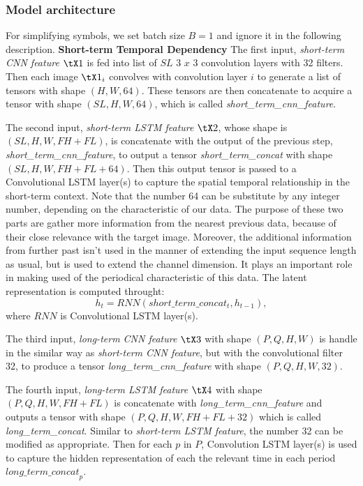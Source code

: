 \subsubsection{Model architecture}
For simplifying symbols, we set batch size $B = 1$ and ignore it in the following description.
\textbf{Short-term Temporal Dependency}
The first input, \textit{short-term CNN feature} $\tX1$ is fed into list of $SL$ 3 $x$ 3 convolution layers with 32 filters. Then each image $\tX1_i$ convolves with convolution layer $i$ to generate a list of tensors with shape $(H, W, 64)$. These tensors are then concatenate to acquire a tensor with shape $(SL, H, W, 64)$, which is called \textit{short\_term\_cnn\_feature}.

The second input, \textit{short-term LSTM feature} $\tX2$, whose shape is $(SL, H, W, FH + FL)$, is concatenate with the output of the previous step, \textit{short\_term\_cnn\_feature}, to output a tensor \textit{short\_term\_concat} with shape $(SL, H, W, FH + FL + 64)$. Then this output tensor is passed to a Convolutional LSTM layer(s) to capture the spatial temporal relationship in the short-term context. Note that the number 64 can be substitute by any integer number, depending on the characteristic of our data. The purpose of these two parts are gather more information from the nearest previous data, because of their close relevance with the target image. Moreover, the additional information from further past isn't used in the manner of extending the input sequence length as usual, but is used to extend the channel dimension. It plays an important role in making used of the periodical characteristic of this data. The latent representation is computed throught:
\[ h_t = RNN(short\_term\_concat_t, h_{t-1}), \] \label{equation-short-term-information}
where $RNN$ is Convolutional LSTM layer(s).

The third input, \textit{long-term CNN feature} $\tX3$ with shape $(P, Q, H, W)$ is handle in the similar way as \textit{short-term CNN feature}, but with the convolutional filter 32, to produce a tensor \textit{long\_term\_cnn\_feature} with shape $(P, Q, H, W, 32)$. 

The fourth input, \textit{long-term LSTM feature} $\tX4$ with shape $(P, Q, H, W, FH + FL)$ is concatenate with \textit{long\_term\_cnn\_feature} and outputs a tensor with shape $(P, Q, H, W, FH + FL + 32)$ which is called \textit{long\_term\_concat}. Similar to \textit{short-term LSTM feature}, the number 32 can be modified as appropriate. Then for each $p$ in $P$, Convolution LSTM layer(s) is used to capture the hidden representation of each the relevant time in each period ${long\_term\_concat}_p$. 

